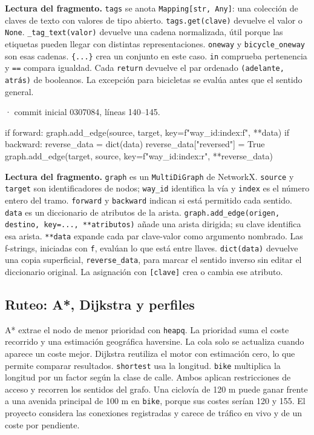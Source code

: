 \documentclass[11pt,a4paper]{article}
\begin{document}
\textbf{Lectura del fragmento.} \texttt{tags} se anota \texttt{Mapping[str, Any]}: una colección de claves de texto con valores de tipo abierto. \texttt{tags.get(clave)} devuelve el valor o \texttt{None}. \texttt{\_tag\_text(valor)} devuelve una cadena normalizada, útil porque las etiquetas pueden llegar con distintas representaciones. \texttt{oneway} y \texttt{bicycle\_oneway} son esas cadenas. \texttt{\{...\}} crea un conjunto en este caso. \texttt{in} comprueba pertenencia y \texttt{==} compara igualdad. Cada \texttt{return} devuelve el par ordenado \texttt{(adelante, atrás)} de booleanos. La excepción para bicicletas se evalúa antes que el sentido general.


\smallskip
{\footnotesize\texttt{} · commit inicial 0307084, líneas 140--145.}\par
\begin{Codigo}[firstnumber=140]
            if forward:
                graph.add_edge(source, target, key=f"{way_id}:{index}:f", **data)
            if backward:
                reverse_data = dict(data)
                reverse_data["reversed"] = True
                graph.add_edge(target, source, key=f"{way_id}:{index}:r", **reverse_data)
\end{Codigo}

\textbf{Lectura del fragmento.} \texttt{graph} es un \texttt{MultiDiGraph} de NetworkX. \texttt{source} y \texttt{target} son identificadores de nodos; \texttt{way\_id} identifica la vía y \texttt{index} es el número entero del tramo. \texttt{forward} y \texttt{backward} indican si está permitido cada sentido. \texttt{data} es un diccionario de atributos de la arista. \texttt{graph.add\_edge(origen, destino, key=..., **atributos)} añade una arista dirigida; su clave identifica esa arista. \texttt{**data} expande cada par clave-valor como argumento nombrado. Las f-strings, iniciadas con \texttt{f}, evalúan lo que está entre llaves. \texttt{dict(data)} devuelve una copia superficial, \texttt{reverse\_data}, para marcar el sentido inverso sin editar el diccionario original. La asignación con \texttt{[clave]} crea o cambia ese atributo.


\subsection{Ruteo: A*, Dijkstra y perfiles}
A* extrae el nodo de menor prioridad con \texttt{heapq}. La prioridad suma el coste recorrido y una estimación geográfica haversine. La cola solo se actualiza cuando aparece un coste mejor. Dijkstra reutiliza el motor con estimación cero, lo que permite comparar resultados. \texttt{shortest} usa la longitud. \texttt{bike} multiplica la longitud por un factor según la clase de calle. Ambos aplican restricciones de acceso y recorren los sentidos del grafo. Una ciclovía de 120 m puede ganar frente a una avenida principal de 100 m en \texttt{bike}, porque sus costes serían 120 y 155. El proyecto considera las conexiones registradas y carece de tráfico en vivo y de un coste por pendiente.
\end{document}
